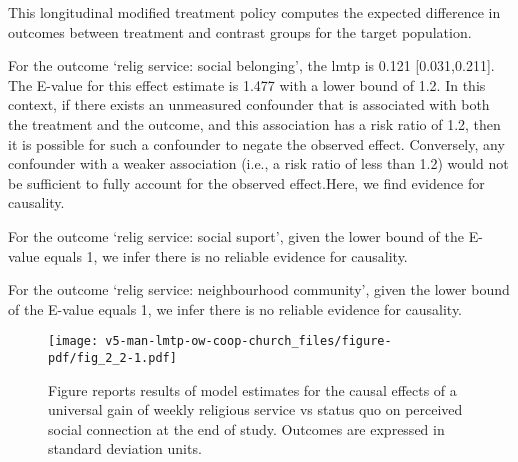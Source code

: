 \documentclass[
  singlecolumn]{article}
\begin{document}
This longitudinal modified treatment policy computes the expected
difference in outcomes between treatment and contrast groups for the
target population.

For the outcome `relig service: social belonging', the lmtp is 0.121
{[}0.031,0.211{]}. The E-value for this effect estimate is 1.477 with a
lower bound of 1.2. In this context, if there exists an unmeasured
confounder that is associated with both the treatment and the outcome,
and this association has a risk ratio of 1.2, then it is possible for
such a confounder to negate the observed effect. Conversely, any
confounder with a weaker association (i.e., a risk ratio of less than
1.2) would not be sufficient to fully account for the observed
effect.Here, we find evidence for causality.

For the outcome `relig service: social suport', given the lower bound of
the E-value equals 1, we infer there is no reliable evidence for
causality.

For the outcome `relig service: neighbourhood community', given the
lower bound of the E-value equals 1, we infer there is no reliable
evidence for causality.

\newpage{}

\begin{figure}[H]

{\centering \texttt{[image: v5-man-lmtp-ow-coop-church\_files/figure-pdf/fig\_2\_2-1.pdf]}

}

\caption{Figure reports results of model estimates for the causal
effects of a universal gain of weekly religious service vs status quo on
perceived social connection at the end of study. Outcomes are expressed
in standard deviation units.}

\end{figure}%
\end{document}
